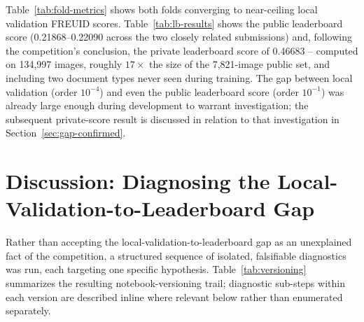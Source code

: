 \documentclass{article}
\begin{document}
\begin{table}[t]
\centering
\caption{Leaderboard results. Public and private scores are computed by
Kaggle against held-out ground truth not available locally.}
\label{tab:lb-results}
\end{table}
\vspace{-0.3cm}

Table~\ref{tab:fold-metrics} shows both folds converging to near-ceiling
local validation FREUID scores. Table~\ref{tab:lb-results} shows the public
leaderboard score (0.21868--0.22090 across the two closely related
submissions) and, following the competition's conclusion, the private
leaderboard score of 0.46683 -- computed on 134,997 images, roughly
$17\times$ the size of the 7,821-image public set, and including two
document types never seen during training. The gap between local validation
(order $10^{-4}$) and even the public leaderboard score (order $10^{-1}$)
was already large enough during development to warrant investigation; the
subsequent private-score result is discussed in relation to that
investigation in Section~\ref{sec:gap-confirmed}.

\section{Discussion: Diagnosing the Local-Validation-to-Leaderboard Gap}
\label{sec:discussion}

Rather than accepting the local-validation-to-leaderboard gap as an
unexplained fact of the competition, a structured sequence of isolated,
falsifiable diagnostics was run, each targeting one specific hypothesis.
Table~\ref{tab:versioning} summarizes the resulting notebook-versioning
trail; diagnostic sub-steps within each version are described inline where
relevant below rather than enumerated separately.
\end{document}
